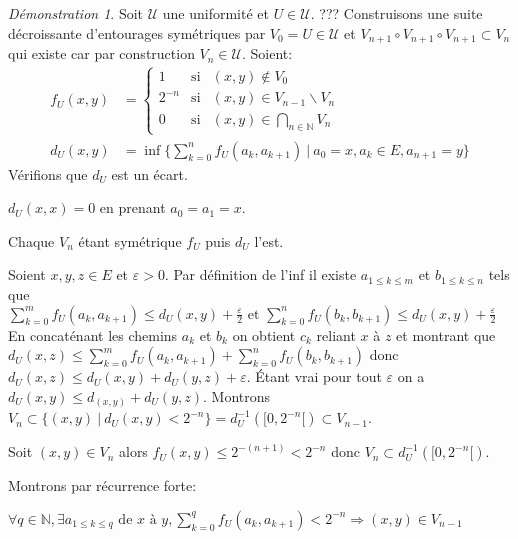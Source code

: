 \documentclass[a4paper, 11pt, french]{book}
\newenvironment{itemise}{\itemize}{\enditemize}
\theoremstyle{plain} %
\theoremstyle{definition} %
\theoremstyle{remark} %
\newtheorem*{demonstration}{Démonstration}
\renewcommand{\setminus}{\backslash}
\newcommand{\1}{\mathds{1}}
\newcommand{\infegal}{\leqslant}
\newcommand{\inv}[1]{#1^{-1}}
\newcommand\et{\text{ et }}
\newcommand{\N}{\mathbb{N}}
\newcommand\ens[2]{\{#1 \ |\ #2\}}
\begin{document}
\begin{demonstration}
	\begin{itemise}
		\item Soit $\mathscr{U}$ une uniformité et $U\in\mathscr{U}$. {\color{red} ???}
		Construisons une suite décroissante d'entourages symétriques par $V_0=U\in\mathscr{U}$ et $V_{n+1}\circ V_{n+1}\circ V_{n+1}\subset V_n$ qui existe car par construction $V_n\in\mathscr{U}$.
		Soient:
		\begin{align*}
			f_U(x, y) & =
			\left\{\begin{array}{lll}
				1      & \text{si} & (x, y)\notin V_0               \\
				2^{-n} & \text{si} & (x, y)\in V_{n-1}\setminus V_n \\
				0      & \text{si} & (x, y)\in\bigcap_{n\in\N} V_n
			\end{array}\right.\\
			d_U(x, y) & =\inf\ens{\sum_{k=0}^nf_U(a_k, a_{k+1})}{a_0=x, a_k\in E, a_{n+1}=y}
		\end{align*}
		Vérifions que $d_U$ est un écart.
		\begin{itemise}
			\item $d_U(x,x)=0$ en prenant $a_0=a_1=x$.
			\item Chaque $V_n$ étant symétrique $f_U$ puis $d_U$ l'est.
			\item Soient $x, y, z\in E$ et $\varepsilon>0$.
			Par définition de l'inf il existe $a_{1\infegal k\infegal m}$ et $b_{1\infegal k\infegal n}$ tels que $\sum_{k=0}^mf_U(a_k, a_{k+1})\infegal d_U(x, y)+\frac{\varepsilon}{2}\et \sum_{k=0}^nf_U(b_k, b_{k+1})\infegal d_U(x, y)+\frac{\varepsilon}{2}$
			En concaténant les chemins $a_k$ et $b_k$ on obtient $c_k$ reliant $x$ à $z$ et montrant que $d_U(x, z)\infegal\sum_{k=0}^mf_U(a_k, a_{k+1})+\sum_{k=0}^nf_U(b_k, b_{k+1})$ donc $d_U(x, z)\infegal d_U(x, y)+d_U(y, z)+\varepsilon$.
			Étant vrai pour tout $\varepsilon$ on a $d_U(x, y)\infegal d_(x, y)+d_U(y, z)$.
		\end{itemise}
		Montrons $V_n\subset\ens{(x, y)}{d_U(x, y)<2^{-n}}=\inv{d_U}([0,2^{-n}[)\subset V_{n-1}$.
		\begin{itemise}
			\item Soit $(x, y)\in V_n$ alors $f_U(x, y)\infegal 2^{-(n+1)}<2^{-n}$ donc $V_n\subset\inv{d_U}([0,2^{-n}[)$.
			\item Montrons par récurrence forte:
			\begin{itemise}
				\item $\forall q\in\N, \exists a_{1\infegal k\infegal q}\text{ de }x\text{ à }y, \sum_{k=0}^qf_U(a_k, a_{k+1})<2^{-n}\Rightarrow (x, y)\in V_{n-1}$

\end{itemise}
\end{itemise}
\end{itemise}
\end{demonstration}
\end{document}
